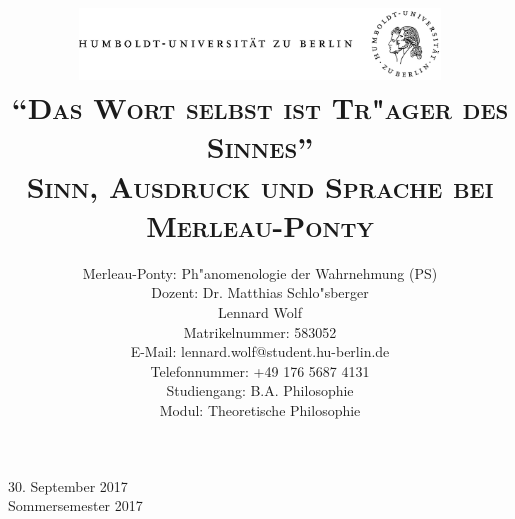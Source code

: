 \documentclass[a4paper, 12pt]{article}
\date{\vspace{-3ex}}
\begin{document}
\title{\vspace{5ex}
	\includegraphics*[bb=0 0 720 200, width=0.72\textwidth]{ErstesSem/images/hu_logo.png}\\
	\vspace{30pt}
	\scshape\LARGE{"`Das Wort selbst ist Tr"ager des Sinnes"'}\\\Large{Sinn, Ausdruck und Sprache bei Merleau-Ponty}\\\vspace{20pt}}
	


\author{Merleau-Ponty: Ph"anomenologie der Wahrnehmung (PS)\\
	\vspace{7pt}
          Dozent: Dr. Matthias Schlo"sberger\\\vspace{4pt}Lennard Wolf\\
        \small{Matrikelnummer: 583052}\\
        \small{E-Mail: lennard.wolf@student.hu-berlin.de}\\
        \small{Telefonnummer: +49 176 5687 4131}\\
        \small{Studiengang: B.A. Philosophie}\\
        \small{Modul: Theoretische Philosophie}}


\maketitle

\vspace{\fill}

\begin{minipage}[]{0.92\textwidth}
    \centering
    \onehalfspacing
    \large   
    30. September 2017\\
    Sommersemester 2017

    \vspace{-20mm} 
\end{minipage}%
\thispagestyle{empty}
\newpage
\setcounter{page}{1}
\end{document}
